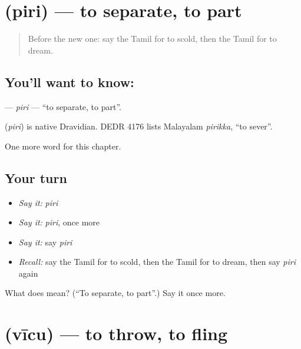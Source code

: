 \section[\texorpdfstring{\ta{பிரி} (piri)}{பிரி (piri)}]{ (piri) — to separate, to part}

\label{lesson:TA-C229-piri}



\begin{quote}
Before the new one: say the Tamil for to scold, then the Tamil for to dream.
\end{quote}

\subsection*{You'll want to know: }
\textbf{} — \emph{piri} — \textquotedblleft{}to separate, to part\textquotedblright{}.

\begin{cousinweb}
\textbf{} (\emph{piri}) is native Dravidian. DEDR 4176 lists Malayalam \emph{pirikka}, \textquotedblleft{}to sever\textquotedblright{}.
\end{cousinweb}

\begin{grammarlens}[title={What you've built}]
One more word for this chapter.
\end{grammarlens}

\subsection*{Your turn}
\begin{itemize}
\raggedright
  \item \emph{Say it:} \emph{piri}
  \item \emph{Say it:} \emph{piri}, once more
  \item \emph{Say it:} say \emph{piri}
  \item \emph{Recall:} say the Tamil for to scold, then the Tamil for to dream, then say \emph{piri} again
\end{itemize}

\begin{tcolorbox}[breakable,colback=teal!4,colframe=teal!35!black,title={Before you move on}]
What does  mean? (\textquotedblleft{}To separate, to part\textquotedblright{}.) Say it once more.
\end{tcolorbox}
\section[\texorpdfstring{\ta{வீசு} (vīcu)}{வீசு (vīcu)}]{ (vīcu) — to throw, to fling}

